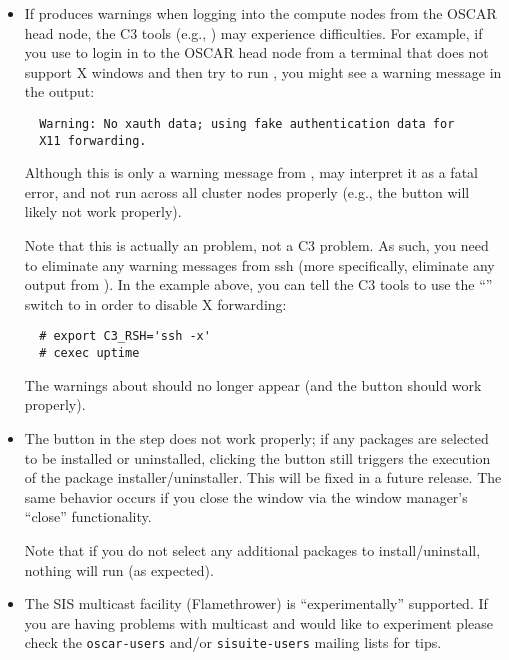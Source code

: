 \begin{itemize}
\begchange
\item If  produces warnings when logging into the compute
  nodes from the OSCAR head node, the C3 tools (e.g., ) may
  experience difficulties.  For example, if you use  to login
  in to the OSCAR head node from a terminal that does not support X
  windows and then try to run , you might see a warning
  message in the  output:

\begin{verbatim}
  Warning: No xauth data; using fake authentication data for 
  X11 forwarding.
\end{verbatim}
  
  Although this is only a warning message from , 
  may interpret it as a fatal error, and not run across all cluster
  nodes properly (e.g., the  button
  will likely not work properly).

  Note that this is actually an  problem, not a C3 problem.
  As such, you need to eliminate any warning messages from ssh (more
  specifically, eliminate any output from ).  In the
  example above, you can tell the C3 tools to use the ``''
  switch to  in order to disable X forwarding:

\begin{verbatim}
  # export C3_RSH='ssh -x'
  # cexec uptime
\end{verbatim}
  
  The warnings about  should no longer appear (and the
   button should work properly).
  
\item The  button in the  step does not work properly; if any packages are selected
  to be installed or uninstalled, clicking the  button
  still triggers the execution of the package installer/uninstaller.
  This will be fixed in a future release.  The same behavior occurs if
  you close the window via the window manager's ``close''
  functionality.

  Note that if you do not select any additional packages to
  install/uninstall, nothing will run (as expected).

\item The SIS multicast facility (Flamethrower) is ``experimentally'' 
  supported.  If you are having problems with multicast and would like 
  to experiment please check the {\tt oscar-users} and/or 
  {\tt sisuite-users} mailing lists for tips.

\endchange

\end{itemize}

